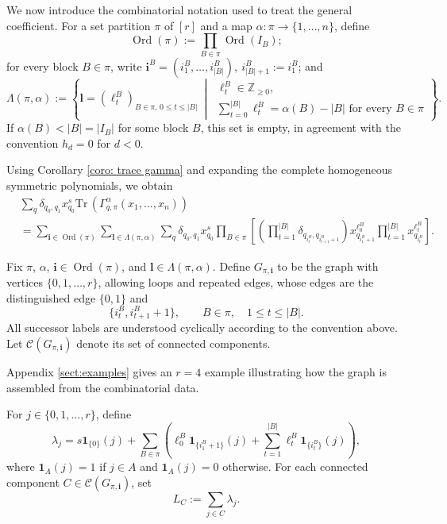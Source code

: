 \documentclass[11pt,reqno]{amsart}
\theoremstyle{definition}
\newcommand{\bbZ}{\mathbb{Z}}
\newcommand{\Tr}{\mathrm{Tr} \,}
\newcommand{\bfl}{\mathbf{l}}
\newcommand{\Ord}{\operatorname{Ord}}
\newcommand{\mC}{\mathcal{C}}
\newcommand{\ind}{\mathbf{1}}
\newcommand{\bfi}{\mathbf{i}}
\begin{document}
We now introduce the combinatorial notation used to treat the general
coefficient.
For a set partition \(\pi\) of \([r]\) and a map
\(\alpha:\pi\to\{1,\dots,n\}\), define
\[
\Ord(\pi):=\prod_{B\in\pi}\Ord(I_B);
\]
for every block \(B\in\pi\), write
\(\bfi^B=(i_1^B,\ldots,i_{|B|}^B),\ i_{|B|+1}^B:=i_1^B\);
and
\[
\Lambda(\pi,\alpha):=
\left\{\bfl=(\ell_t^B)_{B\in\pi,\,0\leq t\leq |B|}\ \middle|\
\begin{array}{l}
 \ell_t^B\in\bbZ_{\geq0},\\
 \sum_{t=0}^{|B|}\ell_t^B=\alpha(B)-|B|\text{ for every }B\in\pi
\end{array}
\right\}.
\]
If \(\alpha(B)<|B|=|I_B|\) for some block \(B\), this set is empty, in agreement
with the convention \(h_d=0\) for \(d<0\).


Using Corollary \ref{coro: trace gamma} and expanding the complete homogeneous
symmetric polynomials, we obtain
\begin{equation}\label{for: coeff expand}
	\begin{aligned}
		&\sum_q
		\delta_{q_0,q_1}x_{q_0}^{s}
		\Tr \left(
		\Gamma_{q,\pi}^{\alpha}(x_1,\ldots,x_n)
		\right)
		\\
		&=
		\sum_{\bfi\in\Ord (\pi)}
		\sum_{\bfl\in\Lambda(\pi,\alpha)}
		\sum_q
		\delta_{q_0,q_1}x_{q_0}^{s}
		\prod_{B\in\pi}
		\left[
		\left(
		\prod_{t=1}^{|B|}
		\delta_{q_{i_t^B},q_{i_{t+1}^B+1}}
		\right)
		x_{q_{i_1^B+1}}^{\ell_0^B}
		\prod_{t=1}^{|B|}
		x_{q_{i_t^B}}^{\ell_t^B}
		\right].
		\end{aligned}
\end{equation}

Fix \(\pi\), \(\alpha\), \(\bfi\in\Ord(\pi)\), and
\(\bfl\in\Lambda(\pi,\alpha)\).  Define \(G_{\pi,\bfi}\) to be the graph
with vertices \(\{0,1,\ldots,r\}\), allowing loops and
repeated edges, whose edges are the distinguished edge \(\{0,1\}\) and
\[
\{i_t^B,i_{t+1}^B+1\},
\qquad B\in\pi,
\quad 1\leq t\leq|B|.
\]
All successor labels are understood cyclically according to the
convention above.  Let \(\mC(G_{\pi,\bfi})\) denote its set of connected
components.

Appendix \ref{sect:examples} gives an \(r=4\) example illustrating how the graph is assembled from the combinatorial data.

{For \(j\in\{0,1,\dots,r\}\), define
\[
\lambda_j
=
s\ind_{\{0\}}(j)
+
\sum_{B\in\pi}
\left(
\ell_0^B\ind_{\{i_1^B +1\}}(j)
+
\sum_{t=1}^{|B|}
\ell_t^B\ind_{\{i_t^B\}}(j)
\right),
\]
where \(\ind_A(j)=1\) if \(j\in A\) and \(\ind_A(j)=0\) otherwise.  For each connected component \(C\in\mC(G_{\pi,\bfi})\), set
\[
L_C:=\sum_{j\in C}\lambda_j.
\]}
\end{document}
